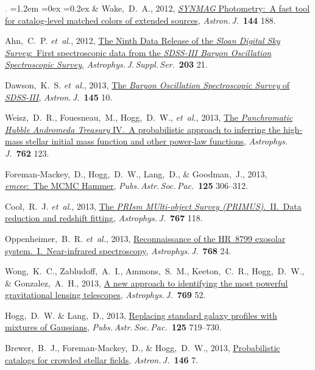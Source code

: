 \documentclass[10pt,letterpaper]{article}
\newcommand{\acronym}[1]{{\small{#1}}}
\newcommand{\foreign}[1]{\textsl{#1}}
\newcommand{\etal}{\foreign{et~al.}}
\newcommand{\project}[1]{\textsl{#1}}
\newcommand{\doi}[2]{\href{http://dx.doi.org/#1}{{#2}}}
\newcommand{\deemph}[1]{\textcolor{grey}{\footnotesize{#1}}}
\newcommand{\pubnumber}[1]{\deemph{{#1}.}}
\newcounter{refpubnum}
\newcommand{\hogglist}{%
    \rightmargin=0in
    \leftmargin=1.2em
    \topsep=0ex
    \partopsep=0pt
    \itemsep=0.2ex
    \parsep=0pt
    \itemindent=-1.0\leftmargin
    \listparindent=0.0\leftmargin
    \settowidth{\labelsep}{~}
    \usecounter{refpubnum}
  }
\begin{document}
\begin{list}{\pubnumber{\therefpubnum}}{\hogglist}
\& Wake,~D.~A., 2012,
\doi{10.1088/0004-6256/144/6/188}{\project{SYNMAG} Photometry:\ A fast tool for catalog-level matched colors of extended sources},
\textit{Astron.\,J.}\ \textbf{144} 188.
\item
Ahn,~C.~P. \etal, 2012,
\doi{10.1088/0067-0049/203/2/21}{The Ninth Data Release of the \project{Sloan Digital Sky Survey}:\ First spectroscopic data from the \project{\acronym{SDSS-III} Baryon Oscillation Spectroscopic Survey}},
\textit{Astrophys.\,J.\,Suppl.\,Ser.}\ \textbf{203} 21.
\item
Dawson,~K.~S. \etal, 2013,
\doi{10.1088/0004-6256/145/1/10}{The \project{Baryon Oscillation Spectroscopic Survey} of \project{\acronym{SDSS-III}}},
\textit{Astron.\,J.}\ \textbf{145} 10.
\item
Weisz,~D.~R., Fouesneau,~M., Hogg,~D.~W., \etal, 2013,
\doi{10.1088/0004-637X/762/2/123}{The \project{Panchromatic Hubble Andromeda Treasury} \acronym{IV}.\ A probabilistic approach to inferring the high-mass stellar initial mass function and other power-law functions},
\textit{Astrophys.\,J.}\ \textbf{762} 123.
\item
Foreman-Mackey,~D., Hogg,~D.~W., Lang,~D., \& Goodman,~J., 2013,
\doi{10.1086/670067}{\project{emcee}:\ The MCMC Hammer},
\textit{Pubs.\,Astr.\,Soc.\,Pac.}\ \textbf{125} 306--312.
\item
Cool,~R.~J. \etal, 2013,
\doi{10.1088/0004-637X/767/2/118}{The \project{PRIsm MUlti-object Survey (\acronym{PRIMUS})}.\ \acronym{II}.\ Data reduction and redshift fitting},
\textit{Astrophys.\,J.}\ \textbf{767} 118.
\item
Oppenheimer,~B.~R. \etal, 2013,
\doi{10.1088/0004-637X/768/1/24}{Reconnaissance of the HR~8799 exosolar system.\ \acronym{I}.\ Near-infrared spectroscopy},
\textit{Astrophys.\,J.}\ \textbf{768} 24.
\item
Wong,~K.~C., Zabludoff,~A.~I., Ammons,~S.~M., Keeton,~C.~R., Hogg,~D.~W., \& Gonzalez,~A.~H., 2013,
\doi{10.1088/0004-637X/769/1/52}{A new approach to identifying the most powerful gravitational lensing telescopes},
\textit{Astrophys.\,J.}\ \textbf{769} 52.
\item
Hogg,~D.~W. \& Lang,~D., 2013,
\doi{10.1086/671228}{Replacing standard galaxy profiles with mixtures of Gaussians},
\textit{Pubs.\,Astr.\,Soc.\,Pac.}\ \textbf{125} 719--730.
\item
Brewer,~B.~J., Foreman-Mackey,~D., \& Hogg,~D.~W., 2013,
\doi{10.1088/0004-6256/146/1/7}{Probabilistic catalogs for crowded stellar fields},
\textit{Astron.\,J.}\ \textbf{146} 7.
\item

\end{list}
\end{document}
